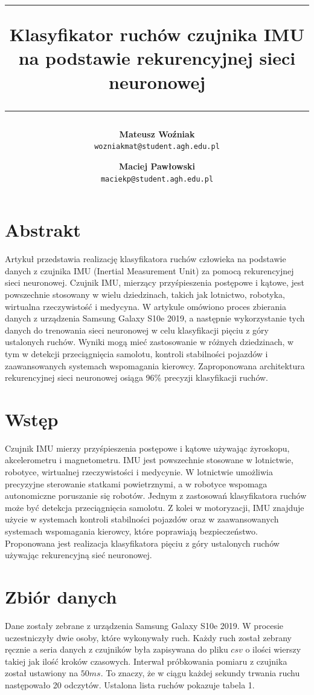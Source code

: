 \documentclass[10pt]{article}
\title{
\rule{\linewidth}{3pt}
Klasyfikator ruchów czujnika IMU na podstawie rekurencyjnej sieci neuronowej
\rule{\linewidth}{1pt}
}
\author{
  \textbf{Mateusz Woźniak}\\
  \texttt{wozniakmat@student.agh.edu.pl}
  \and
  \textbf{Maciej Pawłowski}\\
  \texttt{maciekp@student.agh.edu.pl}
}
\date{}
\begin{document}
\maketitle

\section*{Abstrakt}

Artykuł przedstawia realizację klasyfikatora ruchów człowieka na podstawie danych z czujnika IMU (Inertial Measurement Unit) za pomocą rekurencyjnej sieci neuronowej. Czujnik IMU, mierzący przyśpieszenia postępowe i kątowe, jest powszechnie stosowany w wielu dziedzinach, takich jak lotnictwo, robotyka, wirtualna rzeczywistość i medycyna. W artykule omówiono proces zbierania danych z urządzenia Samsung Galaxy S10e 2019, a następnie wykorzystanie tych danych do trenowania sieci neuronowej w celu klasyfikacji pięciu z góry ustalonych ruchów. Wyniki mogą mieć zastosowanie w różnych dziedzinach, w tym w detekcji przeciągnięcia samolotu, kontroli stabilności pojazdów i zaawansowanych systemach wspomagania kierowcy. Zaproponowana architektura rekurencyjnej sieci neuronowej osiąga 96\% precyzji klasyfikacji ruchów.

\section{Wstęp}

Czujnik IMU mierzy przyśpieszenia postępowe i kątowe używając żyroskopu, akcelerometru i magnetometru. 
IMU jest powszechnie stosowane w lotnictwie, robotyce, wirtualnej rzeczywistości i medycynie. W lotnictwie umożliwia precyzyjne sterowanie statkami powietrznymi, a w robotyce wspomaga autonomiczne poruszanie się robotów. Jednym z zastosowań klasyfikatora ruchów może być detekcja przeciągnięcia samolotu. Z kolei w motoryzacji, IMU znajduje użycie w systemach kontroli stabilności pojazdów oraz w zaawansowanych systemach wspomagania kierowcy, które poprawiają bezpieczeństwo. Proponowana jest realizacja klasyfikatora pięciu z góry ustalonych ruchów używając rekurencyjną sieć neuronowej. 


\section{Zbiór danych}
Dane zostały zebrane z urządzenia Samsung Galaxy S10e 2019. W procesie uczestniczyły dwie osoby, które wykonywały ruch. Każdy ruch został zebrany ręcznie a seria danych z czujników była zapisywana do pliku $csv$ o ilości wierszy takiej jak ilość kroków czasowych. Interwał próbkowania pomiaru z czujnika został ustawiony na $50ms$. To znaczy, że w ciągu każdej sekundy trwania ruchu następowało 20 odczytów. Ustalona lista ruchów pokazuje tabela 1. 
\end{document}
